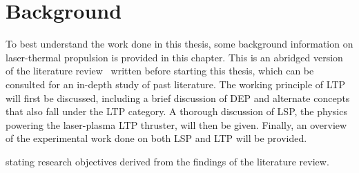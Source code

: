 \chapter{Background} \label{chp:background}
    To best understand the work done in this thesis, some background information on laser-thermal propulsion is provided in this chapter. This is an abridged version of the literature review~\cite{duplayReviewLaserThermalPropulsion2022} written before starting this thesis, which can be consulted for an in-depth study of past literature. The working principle of LTP will first be discussed, including a brief discussion of DEP and alternate concepts that also fall under the LTP category. A thorough discussion of LSP, the physics powering the laser-plasma LTP thruster, will then be given. Finally, an overview of the experimental work done on both LSP and LTP will be provided.

     stating research objectives derived from the findings of the literature review.

